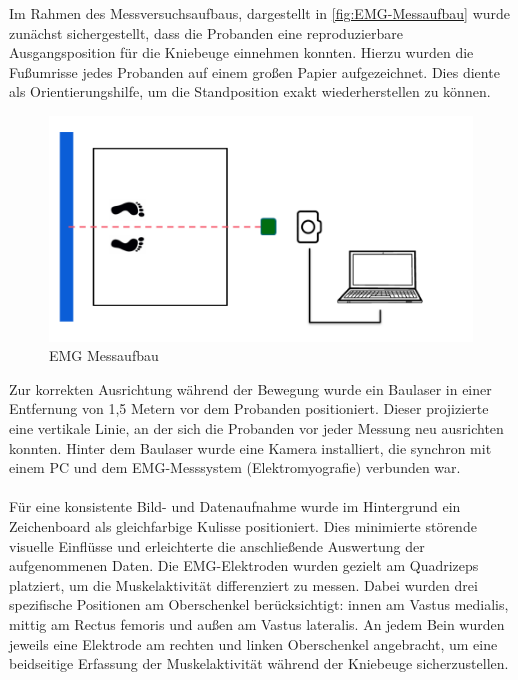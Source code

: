 Im Rahmen des Messversuchsaufbaus, dargestellt in \autoref{fig:EMG-Messaufbau} wurde zunächst sichergestellt, dass die Probanden eine reproduzierbare Ausgangsposition für die Kniebeuge einnehmen konnten.
Hierzu wurden die Fußumrisse jedes Probanden auf einem großen Papier aufgezeichnet.
Dies diente als Orientierungshilfe, um die Standposition exakt wiederherstellen zu können.
\begin{figure}[h!]
    \centering
    \includegraphics[width=0.8\linewidth]{img/Aufbau-EMG.png}
    \caption{EMG Messaufbau}
    \label{fig:EMG-Messaufbau}
\end{figure}
Zur korrekten Ausrichtung während der Bewegung wurde ein Baulaser in einer Entfernung von 1,5 Metern vor dem Probanden positioniert. 
Dieser projizierte eine vertikale Linie, an der sich die Probanden vor jeder Messung neu ausrichten konnten. 
Hinter dem Baulaser wurde eine Kamera installiert, die synchron mit einem PC und dem EMG-Messsystem (Elektromyografie) verbunden war.\\
\\
Für eine konsistente Bild- und Datenaufnahme wurde im Hintergrund ein Zeichenboard als gleichfarbige Kulisse positioniert. Dies minimierte störende visuelle Einflüsse und erleichterte die anschließende Auswertung der aufgenommenen Daten.
Die EMG-Elektroden wurden gezielt am Quadrizeps platziert, um die Muskelaktivität differenziert zu messen. 
Dabei wurden drei spezifische Positionen am Oberschenkel berücksichtigt: innen am Vastus medialis, mittig am Rectus femoris und außen am Vastus lateralis. 
An jedem Bein wurden jeweils eine Elektrode am rechten und linken Oberschenkel angebracht, um eine beidseitige Erfassung der Muskelaktivität während der Kniebeuge sicherzustellen.

